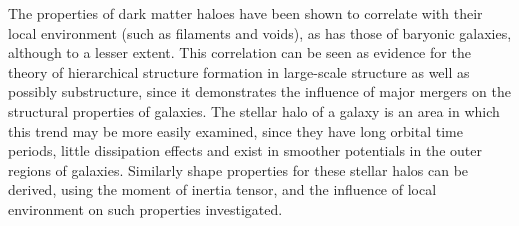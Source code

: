 The properties of dark matter haloes have been shown to correlate with their local environment (such as filaments and voids), as has those of baryonic galaxies, although to a lesser extent. This correlation can be seen as evidence for the theory of hierarchical structure formation in large-scale structure as well as possibly substructure, since it demonstrates the influence of major mergers on the structural properties of galaxies. The stellar halo of a galaxy is an area in which this trend may be more easily examined, since they have long orbital time periods, little dissipation effects and exist in smoother potentials in the outer regions of galaxies. Similarly shape properties for these stellar halos can be derived, using the moment of inertia tensor, and the influence of local environment on such properties investigated.
